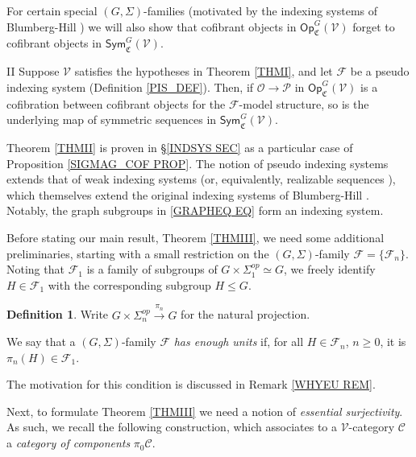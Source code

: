 \documentclass[a4paper,10pt
,draft
]{article}%
\numberwithin{equation}{section}
\numberwithin{figure}{section}
\theoremstyle{definition} %
\newtheorem{definition}[equation]{Definition}%
\newcommand{\Sym}{\ensuremath{\mathsf{Sym}}}%
\newcommand{\Op}{\mathsf{Op}}%
\newcommand{\F}{\ensuremath{\mathcal F}}
\newcommand{\V}{\ensuremath{\mathcal V}}
\renewcommand{\O}{\ensuremath{\mathcal O}}
\newcommand{\1}{\ensuremath{\mathbbm 1}}%
\begin{document}
For certain special $(G,\Sigma)$-families
(motivated by the indexing systems of Blumberg-Hill \cite{BH15})
we will also show that cofibrant objects in 
$\Op^G_{\mathfrak C}(\V)$
forget to cofibrant objects in 
$\mathsf{Sym}^G_{\mathfrak C}(\V)$.


\begin{customthm}{II}\label{THMII}
	Suppose $\V$ satisfies the hypotheses in Theorem \ref{THMI},
	and let $\F$ be a pseudo indexing system (Definition \ref{PIS_DEF}).
	Then, if $\O \to \mathcal{P}$ in $\Op^G_{\mathfrak{C}}(\V)$ is a cofibration between cofibrant objects for the $\F$-model structure,
	so is the underlying
	map of symmetric sequences in $\Sym^G_{\mathfrak{C}}(\V)$.
\end{customthm}


Theorem \ref{THMII} is proven in \S \ref{INDSYS SEC}
as a particular case of Proposition \ref{SIGMAG_COF PROP}.
The notion of pseudo indexing systems
extends that of weak indexing systems \cite[Def. 4.49]{BP_geo}
(or, equivalently, realizable sequences \cite[Def. 4.6]{GW18}),
which themselves extend the original 
indexing systems of Blumberg-Hill \cite{BH15}.
Notably, the graph subgroups in \eqref{GRAPHEQ EQ} form an indexing system.


\vskip 10pt


Before stating our main result, Theorem \ref{THMIII},
we need some additional preliminaries,
starting with a small restriction on the 
$(G,\Sigma)$-family $\mathcal{F} = \{\F_n\}$.
Noting that $\F_1$ is a family of subgroups of 
$G \times \Sigma_1^{op} \simeq G$,
we freely identify 
$H \in \F_1$ with the corresponding subgroup $H \leq G$.

\begin{definition}\label{FAMRESUNI DEF}
	Write $G \times \Sigma_n^{op} \xrightarrow{\pi_n} 
	G$
	for the natural projection.
	
	We say that a $(G,\Sigma)$-family $\F$ 
	\emph{has enough units}	if,
	for all $H \in \F_n$, $n\geq 0$,
	it is $\pi_n(H) \in \F_1$.
\end{definition}

The motivation for this condition is discussed in Remark \ref{WHYEU REM}.


Next, to formulate Theorem \ref{THMIII} we need a notion of 
\emph{essential surjectivity}.
As such, we recall the following construction, 
which associates to a $\V$-category $\mathcal{C}$
a \emph{category of components} $\pi_0 \mathcal{C}$.
\end{document}
